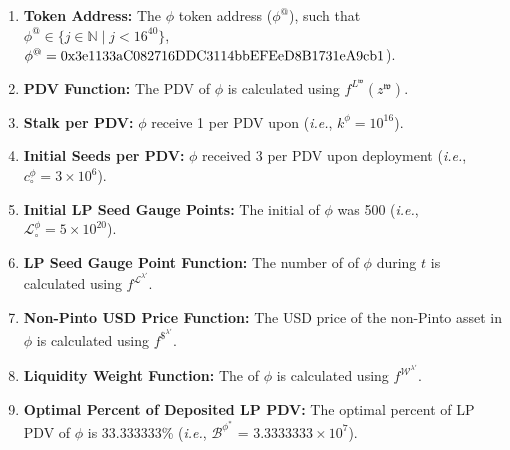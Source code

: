 \documentclass[class=article, crop=false]{standalone}
\begin{document}
\begin{enumerate}

    \item \textbf{Token Address:} The $\phi$ token address ($\phi^{@}$), such that $\phi^{@} \in \{j \in \mathbb{N} \mid j < 16^{40} \}$, $\phi^{@} = \\ \text{0x3e1133aC082716DDC3114bbEFEeD8B1731eA9cb1}$).
    
    \item \textbf{PDV Function:} The PDV of $\phi$ is calculated using $f^{L^{\mathfrak{w}}}(z^{\mathfrak{w}})$.
                
    \item \textbf{Stalk per PDV:} $\phi$  receive 1  per PDV upon  (\textit{i.e.}, $k^{\phi} = 10^{16}$).
    
    \item \textbf{Initial Seeds per PDV:} $\phi$  received 3  per PDV upon deployment (\textit{i.e.}, ${c_{\circ}^{\phi}} = 3 \times 10^6$).

    \item \textbf{Initial LP Seed Gauge Points:} The initial  of $\phi$ was 500 (\textit{i.e.}, $\mathscr{L}_{\circ}^{\phi} = 5 \times 10^{20}$).
    
    \item \textbf{LP Seed Gauge Point Function:} The number of  of $\phi$ during $t$ is calculated using $f^{\mathscr{L}^{\lambda'}}$.
    
    \item \textbf{Non-Pinto USD Price Function:} The USD price of the non-Pinto asset in $\phi$ is calculated using $f^{\$^{\lambda'}}$.

    \item \textbf{Liquidity Weight Function:} The  of $\phi$ is calculated using $f^{\mathscr{W}^{\lambda'}}$.
    
    \item \textbf{Optimal Percent of Deposited LP PDV:} The optimal percent of  LP PDV of $\phi$ is 33.333333\% (\textit{i.e.}, $\mathscr{B}^{\phi^{*}}$ = $3.3333333 \times 10^{7}$).


\end{enumerate}
\end{document}
